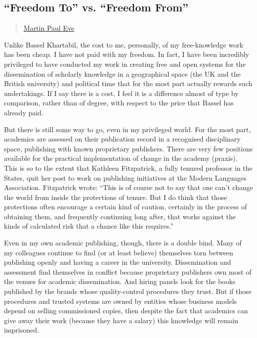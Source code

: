 \subsection{\texorpdfstring{``Freedom To'' vs. ``Freedom
From''}{Freedom To vs. Freedom From}}\label{freedom-to-vs.-freedom-from}

\begin{quote}
\href{../appendix/attributions.html\#martin-paul-eve}{Martin Paul Eve}
\end{quote}

Unlike Bassel Khartabil, the cost to me, personally, of my
free-knowledge work has been cheap. I have not paid with my freedom. In
fact, I have been incredibly privileged to have conducted my work in
creating free and open systems for the dissemination of scholarly
knowledge in a geographical space (the UK and the British university)
and political time that for the most part actually rewards such
undertakings. If I say there is a cost, I feel it is a difference almost
of type by comparison, rather than of degree, with respect to the price
that Bassel has already paid.

But there is still some way to go, even in my privileged world. For the
most part, academics are assessed on their publication record in a
recognised disciplinary space, publishing with known proprietary
publishers. There are very few positions available for the practical
implementation of change in the academy (praxis). This is so to the
extent that Kathleen Fitzpatrick, a fully tenured professor in the
States, quit her post to work on publishing initiatives at the Modern
Languages Association. Fitzpatrick wrote: ``This is of course not to say
that one can't change the world from inside the protections of tenure.
But I do think that those protections often encourage a certain kind of
caution, certainly in the process of obtaining them, and frequently
continuing long after, that works against the kinds of calculated risk
that a chance like this requires.''

Even in my own academic publishing, though, there is a double bind. Many
of my colleagues continue to find (or at least believe) themselves torn
between publishing openly and having a career in the university.
Dissemination and assessment find themselves in conflict because
proprietary publishers own most of the venues for academic
dissemination. And hiring panels look for the books published by the
brands whose quality-control procedures they trust. But if those
procedures and trusted systems are owned by entities whose business
models depend on selling commissioned copies, then despite the fact that
academics can give away their work (because they have a salary) this
knowledge will remain imprisoned.

